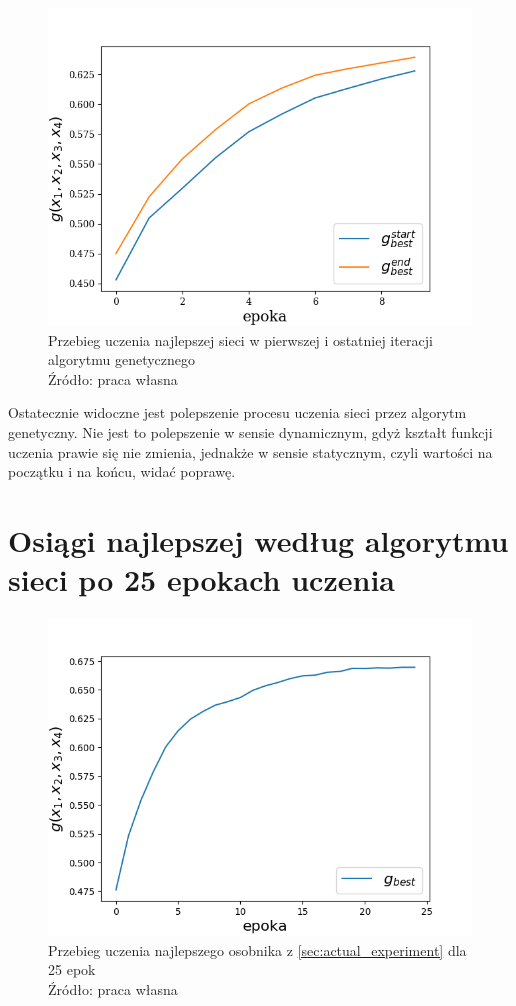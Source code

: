 \begin{figure}[h!tb]
	 \centering
	 \includegraphics[width = 0.85\linewidth]{img/iter_learn_best}
	 \caption{Przebieg uczenia najlepszej sieci w pierwszej i ostatniej iteracji algorytmu genetycznego\\
              Źródło: praca własna}
	 \label{fig:iter_learn_best}
\end{figure}

Ostatecznie widoczne jest polepszenie procesu uczenia sieci przez algorytm genetyczny.
Nie jest to polepszenie w sensie dynamicznym, gdyż kształt funkcji uczenia prawie się nie zmienia, jednakże w sensie statycznym, czyli wartości na początku i na końcu, widać poprawę.

\section{Osiągi najlepszej według algorytmu sieci po 25 epokach uczenia}
\begin{figure}[h!tb]
	 \centering
	 \includegraphics[width = 0.85\linewidth]{img/25epoch}
	 \caption{Przebieg uczenia najlepszego osobnika z \ref{sec:actual_experiment} dla 25 epok\\
              Źródło: praca własna}
	 \label{fig:25epoch}
\end{figure}


